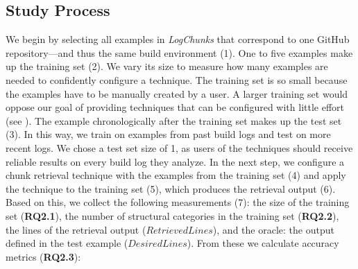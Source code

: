 \subsection{Study Process}
We begin by selecting all examples in \emph{LogChunks}
that correspond to one GitHub repository---and thus the
same build environment (1).
One to five examples make up the training set (2).
We vary its size to measure how many examples are needed to
confidently configure a technique.
The training set is so small because the examples have to be
manually created by a user.
A larger training set would oppose our goal of providing techniques
that can be configured with little effort
(see ).
The example chronologically after the training set makes up the
test set (3).
In this way, we train on examples from past build logs and test on
more recent logs.
We chose a test set size of 1, as users of the techniques
should receive reliable results on every build log they analyze.
In the next step, we configure a chunk retrieval technique with
the examples from the training set (4) and apply the technique to the
training set (5), which produces the retrieval output (6).
Based on this, we collect the following measurements (7):
the size of the training set (\textbf{RQ2.1}),
the number of structural categories in the training
set (\textbf{RQ2.2}),
the lines of the retrieval output ($\mathit{RetrievedLines}$),
and the oracle: the output defined in the test example
($\mathit{DesiredLines}$).
From these we calculate accuracy metrics (\textbf{RQ2.3}):

